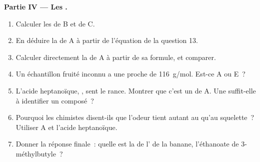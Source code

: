 \begin{problem}
\medskip
\noindent\textbf{Partie IV --- Les .}
\begin{enumerate}[resume]
  \item Calculer les  de B et de C.
  \item En déduire la  de A à partir de l'équation de la
        question 13.
  \item Calculer directement la  de A à partir de sa
        formule, et comparer.
  \item Un échantillon fruité inconnu a une  proche de
        \qty{116}{g/mol}. Est-ce A ou E~?
  \item L'acide heptanoïque, , sent le rance. Montrer
        que c'est un  de A. Une  suffit-elle à
        identifier un composé~?
  \item Pourquoi les chimistes disent-ils que l'odeur tient autant au
         qu'au squelette~? Utiliser A et l'acide
        heptanoïque.
  \item Donner la réponse finale~: quelle est la  de
        l' de la banane, l'éthanoate de 3-méthylbutyle~?
\end{enumerate}
\end{problem}
